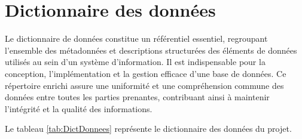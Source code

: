 \documentclass[12pt]{report}
\begin{document}
				\section{Dictionnaire des données}

				\hspace{15pt} Le dictionnaire de données constitue un référentiel essentiel, regroupant l'ensemble des métadonnées et descriptions structurées des éléments de données utilisés au sein d'un système d'information. Il est indispensable pour la conception, l'implémentation et la gestion efficace d'une base de données. Ce répertoire enrichi assure une uniformité et une compréhension commune des données entre toutes les parties prenantes, contribuant ainsi à maintenir l'intégrité et la qualité des informations.

				Le tableau \ref{tab:DictDonnees} représente le dictionnaire des données du projet.
\end{document}
